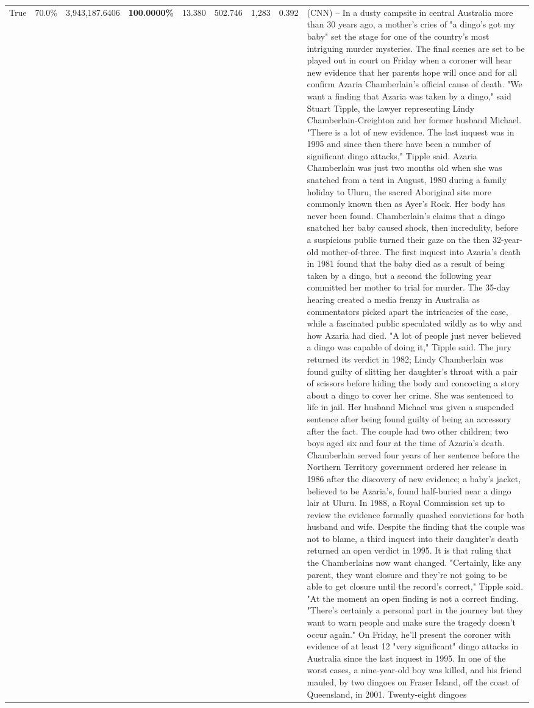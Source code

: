 \begin{table}[H]
\begin{tabular}{lllrlllll}
True & 70.0\% & 3,943,187.6406 & \bfseries \color{red} 100.0000\% & 13.380 & 502.746 & 1,283 & 0.392 & (CNN) -- In a dusty campsite in central Australia more than 30 years ago, a mother's cries of "a dingo's got my baby" set the stage for one of the country's most intriguing murder mysteries. The final scenes are set to be played out in court on Friday when a coroner will hear new evidence that her parents hope will once and for all confirm Azaria Chamberlain's official cause of death. "We want a finding that Azaria was taken by a dingo," said Stuart Tipple, the lawyer representing Lindy Chamberlain-Creighton and her former husband Michael. "There is a lot of new evidence. The last inquest was in 1995 and since then there have been a number of significant dingo attacks," Tipple said. Azaria Chamberlain was just two months old when she was snatched from a tent in August, 1980 during a family holiday to Uluru, the sacred Aboriginal site more commonly known then as Ayer's Rock. Her body has never been found. Chamberlain's claims that a dingo snatched her baby caused shock, then incredulity, before a suspicious public turned their gaze on the then 32-year-old mother-of-three. The first inquest into Azaria's death in 1981 found that the baby died as a result of being taken by a dingo, but a second the following year committed her mother to trial for murder. The 35-day hearing created a media frenzy in Australia as commentators picked apart the intricacies of the case, while a fascinated public speculated wildly as to why and how Azaria had died. "A lot of people just never believed a dingo was capable of doing it," Tipple said. The jury returned its verdict in 1982; Lindy Chamberlain was found guilty of slitting her daughter's throat with a pair of scissors before hiding the body and concocting a story about a dingo to cover her crime. She was sentenced to life in jail. Her husband Michael was given a suspended sentence after being found guilty of being an accessory after the fact. The couple had two other children; two boys aged six and four at the time of Azaria's death. Chamberlain served four years of her sentence before the Northern Territory government ordered her release in 1986 after the discovery of new evidence; a baby's jacket, believed to be Azaria's, found half-buried near a dingo lair at Uluru. In 1988, a Royal Commission set up to review the evidence formally quashed convictions for both husband and wife. Despite the finding that the couple was not to blame, a third inquest into their daughter's death returned an open verdict in 1995. It is that ruling that the Chamberlains now want changed. "Certainly, like any parent, they want closure and they're not going to be able to get closure until the record's correct," Tipple said. "At the moment an open finding is not a correct finding. "There's certainly a personal part in the journey but they want to warn people and make sure the tragedy doesn't occur again." On Friday, he'll present the coroner with evidence of at least 12 "very significant" dingo attacks in Australia since the last inquest in 1995. In one of the worst cases, a nine-year-old boy was killed, and his friend mauled, by two dingoes on Fraser Island, off the coast of Queensland, in 2001. Twenty-eight dingoes 
\end{tabular}
\end{table}

